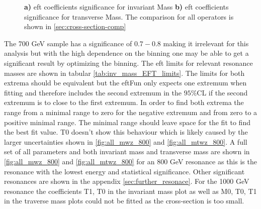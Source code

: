 \documentclass[../Bachelorarbeit.tex]{subfiles}
\begin{document}
\begin{figure}[h]
\begin{subfigure}{0.45\textwidth}
        \caption{}
    \end{subfigure}
    \caption{\textbf{a)} \acrshort{eft} coefficients significance for invariant Mass \textbf{b)} \acrshort{eft} coefficients significance for transverse Mass. The comparison for all operators is shown in \ref{sec:cross-section-comp}}
    \label{fig:corss-section-comparission}
\end{figure}

The 700 GeV sample has a significance of $0.7-0.8$ making it irrelevant for this analysis
but with the high dependence on the binning one may be able to get a significant result by optimizing the binning. The \acrshort{eft} limits for relevant resonance masses are shown in tabular \ref{tab:inv_mass_EFT_limits}. The limits for both extrema should be equivalent but the \acrshort{eft}Fun only expects one extremum when fitting
and therefore includes the second extremum in the $95\%$CL if the second extremum is to close to the first extremum.  In order to find both extrema the range from a minimal range to zero for the negative extremum and from zero to a positive minimal range.
The minimal range should leave space for the fit to find the best fit value. T0 doesn't show this behaviour which is likely caused by the larger uncertainties shown in \ref{fig:all_mwz_800} and \ref{fig:all_mtwz_800}.
A full set of all parameters and both invariant mass and transverse mass are shown in \ref{fig:all_mwz_800} and \ref{fig:all_mtwz_800} for an 800 GeV resonance as this is the resonance with the lowest energy and statistical significance. Other significant resonances are shown in the appendix \ref{sec:further_resonace}.
For the 1000 GeV resonance the coefficients T1, T0 in the invariant mass plot as well as M0, T0, T1 in the traverse mass plots could not be fitted as the cross-section is too small.
\end{document}

